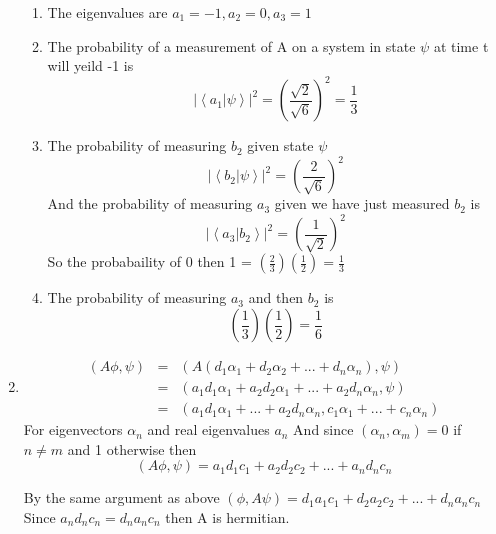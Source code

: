 \documentclass[11pt,fleqn]{article}
\begin{document}
\begin{enumerate}
\begin{enumerate}
\item The eigenvalues are $a_{1}=-1, a_{2}=0, a_{3}=1$
\item The probability of a measurement of A on a system in state $\psi$ at time t will yeild -1 is 
\[
| \left \langle a_{1} \right. \left | \psi \right \rangle |^{2} = (\frac{\sqrt{2}}{\sqrt{6}})^{2} = \frac{1}{3}
\]
\item
The probability of measuring $b_2$ given state $\psi$
\[
| \left \langle b_{2} \right. \left | \psi \right \rangle |^{2} = (\frac{2}{\sqrt{6}})^{2} 
\] 
And the probability of measuring $a_{3}$ given we have just measured $b_{2}$ is 
\[
| \left \langle  a_{3}  \right. \left |b_{2} \right  \rangle |^{2} = (\frac{1}{\sqrt{2}})^{2} 
\] 
So the probabaility of 0 then 1 = $(\frac{2}{3})(\frac{1}{2})=\frac{1}{3}$
\item
The probability of measuring $a_3$ and then $b_2$ is
\[ 
(\frac{1}{3})(\frac{1}{2})=\frac{1}{6}
\]
\end{enumerate}
\item %
\begin{eqnarray}
(A\phi, \psi) &=& (A(d_{1}\alpha_{1}+d_{2}\alpha_{2} + ... + d_{n}\alpha_{n}), \psi) \\
&=& (a_{1}d_{1}\alpha_{1} + a_{2}d_{2}\alpha_{1} + ... + a_{2}d_{n}\alpha_{n}, \psi) \\
&=&(a_{1}d_{1}\alpha_{1} + ... + a_{2}d_{n}\alpha_{n} ,  
c_{1}\alpha_{1} + ... + c_{n}\alpha_{n})
\end{eqnarray}
For eigenvectors $\alpha_{n}$ and real eigenvalues $a_{n}$ And since $(\alpha_{n}, \alpha_{m})=0$ if $n\ne m$ and 1 otherwise then
\[
(A\phi, \psi) = a_{1}d_{1}c_{1}+ a_{2}d_{2}c_{2} + ... + a_{n}d_{n}c_{n}
\]

By the same argument as above  $(\phi, A\psi) = 
d_{1}a_{1}c_{1} + d_{2}a_{2}c_{2} + ... + d_{n}a_{n}c_{n}$
Since $a_{n}d_{n}c_{n}=d_{n}a_{n}c_{n}$ then A is hermitian. 
\end{enumerate}
\end{document}
